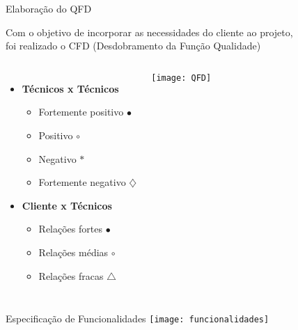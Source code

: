 \begin{frame}[t]{Elaboração do QFD} 

    Com o objetivo de incorporar as necessidades do cliente ao projeto,
    \\ foi realizado o CFD (Desdobramento da Função Qualidade)
    \begin{columns}
            \footnotesize
            \begin{itemize}
                \item \textbf{Técnicos x Técnicos} 
                \begin{itemize}
                    \footnotesize
                    \item Fortemente positivo  $\bullet$
                    \item Positivo $\circ$
                    \item Negativo $\ast$
                    \item Fortemente negativo $\diamondsuit$
                \end{itemize}
                \footnotesize
                \item \textbf{Cliente x Técnicos}
                \begin{itemize}
                    \footnotesize
                    \item Relações fortes $\bullet $
                    \item Relações médias $\circ $
                    \item Relações fracas $\bigtriangleup$
                \end{itemize}
            \end{itemize}
            \vspace{-1.55cm}
            \texttt{[image: QFD]}
    \end{columns}

\end{frame}


\begin{frame}[t]{Especificação de Funcionalidades} 
    \centering
    \texttt{[image: funcionalidades]}

\end{frame}


